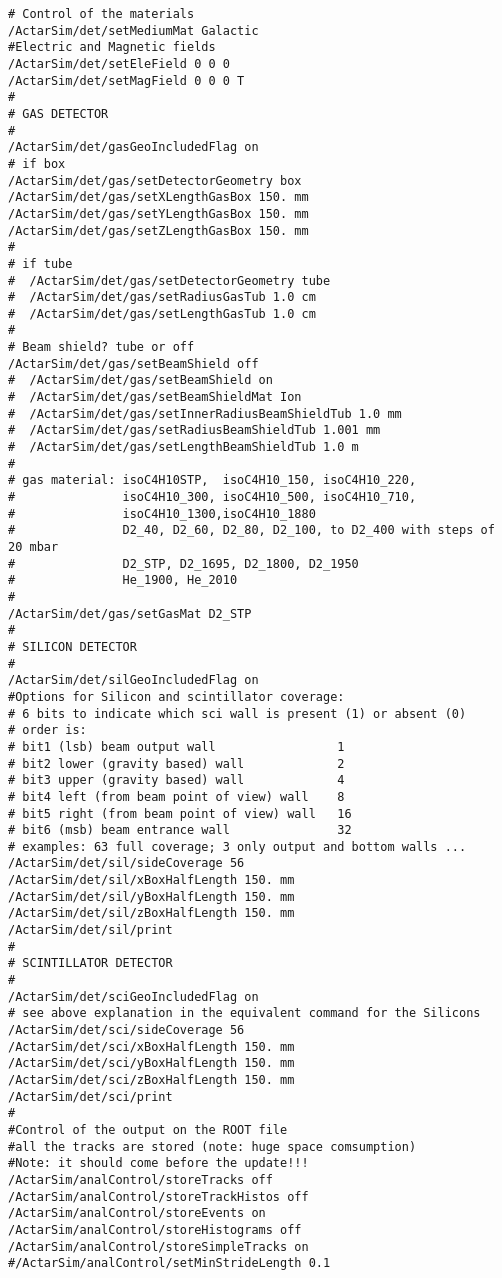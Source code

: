 \begin{verbatim}
# Control of the materials
/ActarSim/det/setMediumMat Galactic
#Electric and Magnetic fields
/ActarSim/det/setEleField 0 0 0
/ActarSim/det/setMagField 0 0 0 T
#
# GAS DETECTOR
#
/ActarSim/det/gasGeoIncludedFlag on
# if box
/ActarSim/det/gas/setDetectorGeometry box
/ActarSim/det/gas/setXLengthGasBox 150. mm
/ActarSim/det/gas/setYLengthGasBox 150. mm
/ActarSim/det/gas/setZLengthGasBox 150. mm
#
# if tube
#  /ActarSim/det/gas/setDetectorGeometry tube
#  /ActarSim/det/gas/setRadiusGasTub 1.0 cm
#  /ActarSim/det/gas/setLengthGasTub 1.0 cm
#
# Beam shield? tube or off
/ActarSim/det/gas/setBeamShield off
#  /ActarSim/det/gas/setBeamShield on
#  /ActarSim/det/gas/setBeamShieldMat Ion
#  /ActarSim/det/gas/setInnerRadiusBeamShieldTub 1.0 mm
#  /ActarSim/det/gas/setRadiusBeamShieldTub 1.001 mm
#  /ActarSim/det/gas/setLengthBeamShieldTub 1.0 m
#
# gas material: isoC4H10STP,  isoC4H10_150, isoC4H10_220,
#               isoC4H10_300, isoC4H10_500, isoC4H10_710,
#               isoC4H10_1300,isoC4H10_1880
#               D2_40, D2_60, D2_80, D2_100, to D2_400 with steps of 20 mbar
#               D2_STP, D2_1695, D2_1800, D2_1950
#               He_1900, He_2010
#
/ActarSim/det/gas/setGasMat D2_STP
#
# SILICON DETECTOR
#
/ActarSim/det/silGeoIncludedFlag on
#Options for Silicon and scintillator coverage:
# 6 bits to indicate which sci wall is present (1) or absent (0)
# order is:
# bit1 (lsb) beam output wall                 1
# bit2 lower (gravity based) wall             2
# bit3 upper (gravity based) wall             4
# bit4 left (from beam point of view) wall    8
# bit5 right (from beam point of view) wall   16
# bit6 (msb) beam entrance wall               32
# examples: 63 full coverage; 3 only output and bottom walls ...
/ActarSim/det/sil/sideCoverage 56
/ActarSim/det/sil/xBoxHalfLength 150. mm
/ActarSim/det/sil/yBoxHalfLength 150. mm
/ActarSim/det/sil/zBoxHalfLength 150. mm
/ActarSim/det/sil/print
#
# SCINTILLATOR DETECTOR
#
/ActarSim/det/sciGeoIncludedFlag on
# see above explanation in the equivalent command for the Silicons
/ActarSim/det/sci/sideCoverage 56
/ActarSim/det/sci/xBoxHalfLength 150. mm
/ActarSim/det/sci/yBoxHalfLength 150. mm
/ActarSim/det/sci/zBoxHalfLength 150. mm
/ActarSim/det/sci/print
#
#Control of the output on the ROOT file
#all the tracks are stored (note: huge space comsumption)
#Note: it should come before the update!!!
/ActarSim/analControl/storeTracks off
/ActarSim/analControl/storeTrackHistos off
/ActarSim/analControl/storeEvents on
/ActarSim/analControl/storeHistograms off
/ActarSim/analControl/storeSimpleTracks on
#/ActarSim/analControl/setMinStrideLength 0.1

\end{verbatim}
